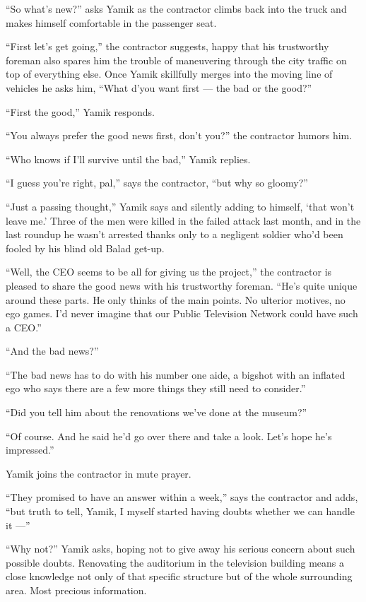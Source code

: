 \documentclass[twoside,11pt]{book}
\begin{document}
``So what's new?'' asks Yamik as the contractor climbs back into the truck and makes himself
comfortable in the passenger seat.

``First let's get going,'' the contractor suggests, happy that his trustworthy foreman also
spares him the trouble of maneuvering through the city traffic on top of everything else. Once Yamik skillfully merges
into the moving line of vehicles he asks him, ``What d'you want first --- the bad or the
good?''

``First the good,'' Yamik responds.

``You always prefer the good news first, don't you?'' the contractor humors him.

``Who knows if I'll survive until the bad,'' Yamik replies.{ }

``I guess you're right, pal,'' says the contractor, ``but why so
gloomy?''

``Just a passing thought,'' Yamik says and silently adding to himself, `that won't leave me.'
Three of the men were killed in the failed attack last month, and in the last roundup he wasn't arrested thanks only to
a negligent soldier who'd been fooled by his blind old Balad get-up.

``Well, the CEO seems to be all for giving us the project,'' the contractor is pleased to
share the good news with his trustworthy foreman. ``He's quite unique around these parts. He only thinks
of the main points. No ulterior motives, no ego games. I'd never imagine that our Public Television Network could have
such a CEO.''

``And the bad news?''

``The bad news has to do with his number one aide, a bigshot with an inflated ego who says there are a few
more things they still need to consider.''

``Did you tell him about the renovations we've done at the museum?''

``Of course. And he said he'd go over there and take a look. Let's hope he's impressed.''

Yamik joins the contractor in mute prayer.

``They promised to have an answer within a week,'' says the contractor and adds,
``but truth to tell, Yamik, I myself started having doubts whether we can handle it ---''

``Why not?'' Yamik asks, hoping not to give away his serious{ }concern about
such possible doubts. Renovating the auditorium in the television building means a close knowledge not only of that
specific structure but of the whole surrounding area. Most precious information.
\end{document}
